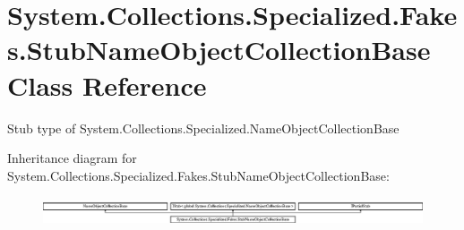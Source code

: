 \hypertarget{class_system_1_1_collections_1_1_specialized_1_1_fakes_1_1_stub_name_object_collection_base}{\section{System.\-Collections.\-Specialized.\-Fakes.\-Stub\-Name\-Object\-Collection\-Base Class Reference}
\label{class_system_1_1_collections_1_1_specialized_1_1_fakes_1_1_stub_name_object_collection_base}
}


Stub type of System.\-Collections.\-Specialized.\-Name\-Object\-Collection\-Base 


Inheritance diagram for System.\-Collections.\-Specialized.\-Fakes.\-Stub\-Name\-Object\-Collection\-Base\-:\begin{figure}[H]
\begin{center}
\leavevmode
\includegraphics[height=0.844646cm]{class_system_1_1_collections_1_1_specialized_1_1_fakes_1_1_stub_name_object_collection_base}
\end{center}
\end{figure}

